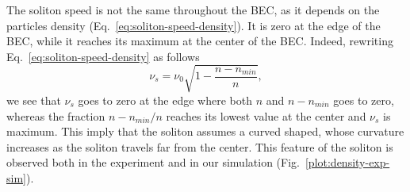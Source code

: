The soliton speed is not the same throughout the BEC, as it depends on the particles density (Eq.~\eqref{eq:soliton-speed-density}). It is zero at the edge of the BEC, while it reaches its maximum at the center of the BEC. Indeed, rewriting Eq.~\eqref{eq:soliton-speed-density} as follows
\begin{equation}
\nu_s = \nu_0 \sqrt{1 - \frac{n - n_{min}}{n}},
\end{equation}
we see that $\nu_s$ goes to zero at the edge where both $n$ and $n - n_{min}$ goes to zero, whereas the fraction $n - n_{min} / n$ reaches its lowest value at the center and $\nu_s$ is maximum. This imply that the soliton assumes a curved shaped, whose curvature increases as the soliton travels far from the center. This feature of the soliton is observed both in the experiment and in our simulation (Fig.~\ref{plot:density-exp-sim}). 

